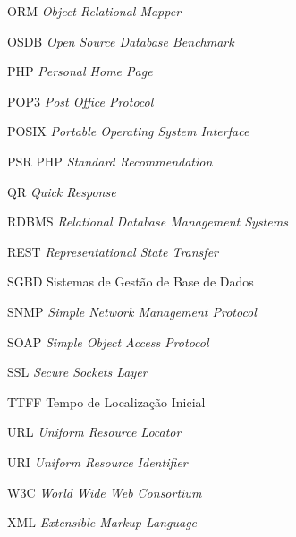 \begin{siglas}
    \item[ORM] \textit{Object Relational Mapper}
    \item[OSDB] \textit{Open Source Database Benchmark}
    \item[PHP] \textit{Personal Home Page}
    \item[POP3] \textit{Post Office Protocol}
    \item[POSIX] \textit{Portable Operating System Interface}
    \item[PSR] PHP \textit{Standard Recommendation}
    \item[QR] \textit{Quick Response}
    \item[RDBMS] \textit{Relational Database Management Systems}
    \item[REST] \textit{Representational State Transfer}
    \item[SGBD] Sistemas de Gestão de Base de Dados
    \item[SNMP] \textit{Simple Network Management Protocol}
    \item[SOAP] \textit{Simple Object Access Protocol}
    \item[SSL] \textit{Secure Sockets Layer}
    \item[TTFF] Tempo de Localização Inicial
    \item[URL] \textit{Uniform Resource Locator}
    \item[URI] \textit{Uniform Resource Identifier}
    \item[W3C] \textit{World Wide Web Consortium}
    \item[XML] \textit{Extensible Markup Language}
\end{siglas}

